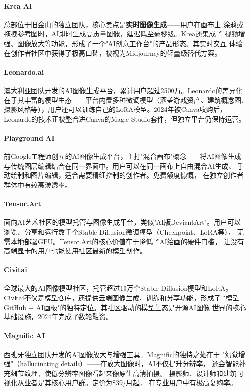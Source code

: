 \paragraph{Krea AI}
总部位于旧金山的独立团队，核心卖点是\textbf{实时图像生成}——用户在画布上
涂鸦或拖拽参考图时，AI即时生成高质量图像，延迟低至毫秒级。Krea还集成了
视频增强、图像放大等功能，形成了一个"AI创意工作台"的产品形态。其实时交互
体验在创作者社区中获得了极高口碑，被视为Midjourney的轻量级替代方案。

\paragraph{Leonardo.ai}
澳大利亚团队开发的AI图像生成平台，累计用户超过2500万。Leonardo的差异化
在于其丰富的模型生态——平台内置多种微调模型（涵盖游戏资产、建筑概念图、
摄影风格等），用户还可以训练自己的LoRA模型。2024年被Canva收购后，
Leonardo的技术正被整合进Canva的Magic Studio套件，但独立平台仍保持运营。

\paragraph{Playground AI}
前Google工程师创立的AI图像生成平台，主打"混合画布"概念——将AI图像生成
与传统图层编辑结合在同一界面中。用户可以在同一画布上自由混合AI生成、
手动绘制和图片编辑，适合需要精细控制的创作者。免费额度慷慨，
在独立创作者群体中有较高渗透率。

\paragraph{Tensor.Art}
面向AI艺术社区的模型托管与图像生成平台，类似"AI版DeviantArt"。用户可以
浏览、分享和运行数千个Stable Diffusion微调模型（Checkpoint、LoRA等），
无需本地部署GPU。Tensor.Art的核心价值在于降低了AI绘画的硬件门槛，
让没有高端显卡的用户也能使用社区最新的模型创作。

\paragraph{Civitai}
全球最大的AI图像模型社区，托管超过10万个Stable Diffusion模型和LoRA。
Civitai不仅是模型仓库，还提供云端图像生成、训练和分享功能，形成了
"模型GitHub + AI画板"的独特定位。其社区驱动的模型生态是开源AI图像
世界的核心基础设施，2024年完成了数轮融资。

\paragraph{Magnific AI}
西班牙独立团队开发的AI图像放大与增强工具。Magnific的独特之处在于
"幻觉增强"（hallucinating details）——在放大图像时，AI不仅提升分辨率，
还会智能补充细节纹理，使低分辨率图像看起来像原生高清拍摄。
摄影师、设计师和建筑可视化从业者是其核心用户群。定价为\$39/月起，
在专业用户中有极高复购率。

